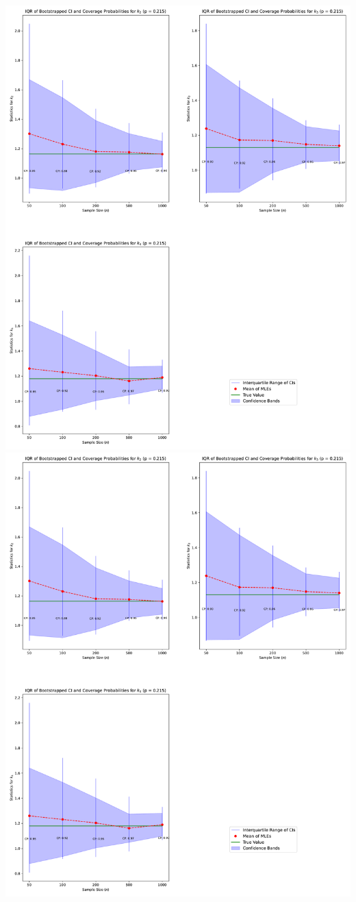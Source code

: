 \documentclass{article}
\begin{document}
\includegraphics[width=0.45\linewidth]{plot-n-vs-stats-p215-shape.pdf}
\hfill
\includegraphics[width=0.45\linewidth]{plot-n-vs-stats-p215-shape.pdf}
\end{document}
